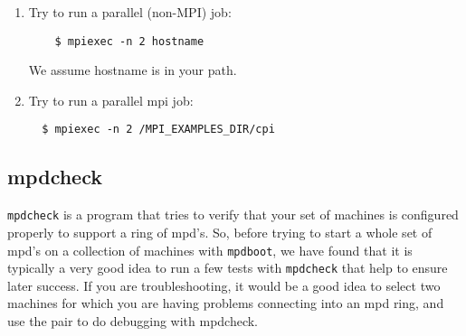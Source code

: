 \documentclass[dvipdfm,11pt]{article}
\begin{document}
\begin{enumerate}
\item Try to run a parallel (non-MPI) job:
\begin{verbatim}
    $ mpiexec -n 2 hostname    
\end{verbatim}
We assume \texttt{}hostname is in your path.

\item Try to run a parallel mpi job:
\begin{verbatim}
  $ mpiexec -n 2 /MPI_EXAMPLES_DIR/cpi    
\end{verbatim}

\end{enumerate}


\subsection{mpdcheck}
\label{sec:mpdcheck}

\texttt{mpdcheck} is a program that tries to verify that your set of
machines is configured properly to support a ring of mpd's.
So, before trying to start a whole set of mpd's on a collection of
machines with \texttt{mpdboot}, we have found that it is typically a
very good idea to run a few tests with \texttt{mpdcheck} that help to ensure
later success.  If you are troubleshooting, it would be a good idea to 
select two machines for which you are having problems connecting into
an mpd ring, and use the pair to do debugging with mpdcheck.
\end{document}
